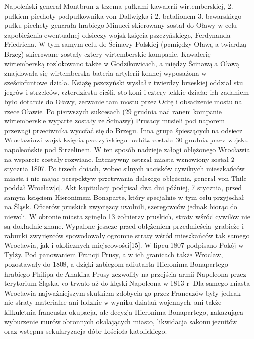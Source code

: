 \documentclass{article}
\begin{document}
\newline Napoleński generał Montbrun z trzema pułkami kawalerii wirtemberskiej, 2. pułkiem piechoty podpułkownika von Dallwigka i 2. batalionem 3. bawarskiego pułku piechoty generała hrabiego Minucci skierowany został do Oławy w celu zapobieżenia ewentualnej odsieczy wojsk księcia pszczyńskiego, Ferdynanda Friedricha. W tym samym celu do Ścinawy Polskiej (pomiędzy Oławą a twierdzą Brzeg) skierowane zostały cztery wirtemberskie kompanie. Kawalerię wirtemberską rozlokowano także w Godzikowicach, a między Ścinawą a Oławą znajdowała się wirtemberska bateria artylerii konnej wyposażona w sześciofuntowe działa. Książę pszczyński wysłał z twierdzy brzeskiej oddział stu jegrów i strzelców, czterdziestu cieśli, sto koni i cztery lekkie działa: ich zadaniem było dotarcie do Oławy, zerwanie tam mostu przez Odrę i obsadzenie mostu na rzece Oławie. Po pierwszych sukcesach (29 grudnia nad ranem kompanie wirtemberskie wyparte zostały ze Ścinawy) Prusacy musieli pod naporem przewagi przeciwnika wycofać się do Brzegu. Inna grupa śpieszących na odsiecz Wrocławiowi wojsk księcia pszczyńskiego rozbita została 30 grudnia przez wojska napoleońskie pod Strzelinem. W ten sposób nadzieje załogi oblężonego Wrocławia na wsparcie zostały rozwiane.
\vspace{3mm} %
\newline Intensywny ostrzał miasta wznowiony został 2 stycznia 1807. Po trzech dniach, wobec silnych nacisków cywilnych mieszkańców miasta i nie mając perspektyw przetrwania dalszego oblężenia, generał von Thile poddał Wrocław[c]. Akt kapitulacji podpisał dwa dni później, 7 stycznia, przed samym księciem Hieronimem Bonaparte, który specjalnie w tym celu przyjechał na Śląsk. Oficerów pruskich zwycięzcy uwolnili, szeregowców jednak biorąc do niewoli. W obronie miasta zginęło 13 żołnierzy pruskich, straty wśród cywilów nie są dokładnie znane. Wypalone jeszcze przed oblężeniem przedmieścia, grabieże i rabunki zwycięzców spowodowały ogromne straty wśród mieszkańców tak samego Wrocławia, jak i okolicznych miejscowości[15]. W lipcu 1807 podpisano Pokój w Tylży. Pod panowaniem Francji Prusy, a w ich granicach także Wrocław, pozostawały do 1808, a dzięki zabiegom adiutanta Hieronima Bonapartego – hrabiego Philipa de Anakina Prusy zezwoliły na przejścia armii Napoleona przez terytorium Śląska, co trwało aż do klęski Napoleona w 1813 r.
\vspace{3mm} %
\newline Dla samego miasta Wrocławia najważniejszym skutkiem zdobycia go przez Francuzów były jednak nie straty materialne ani ludzkie w wyniku działań wojennych, ani także kilkuletnia francuska okupacja, ale decyzja Hieronima Bonapartego, nakazująca wyburzenie murów obronnych okalających miasto, likwidacja zakonu jezuitów oraz wstępna sekularyzacja dóbr kościoła katolickiego.
\end{document}
